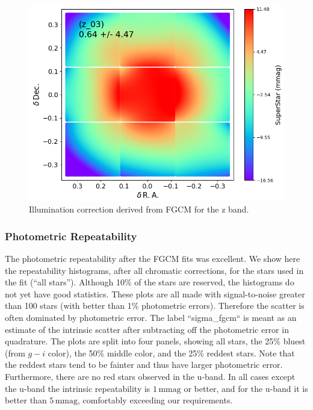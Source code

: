 \begin{figure}
  \includegraphics{photometric_calibration_figures/illumcorr_z.png}
  \caption{Illumination correction derived from FGCM for the z band.}
\end{figure}

\subsubsection{Photometric Repeatability}

The photometric repeatability after the FGCM fits was excellent. We show here
the repeatability histograms, after all chromatic corrections, for the stars
used in the fit (``all stars'').  Although 10\% of the stars are reserved,
the histograms do not yet have good statistics.  These plots are all made with
signal-to-noise greater than 100 stars (with better than 1\% photometric
errors).  Therefore the scatter is often dominated by photometric error.  The
label ``sigma\_fgcm`` is meant as an estimate of the intrinsic scatter after
subtracting off the photometric error in quadrature. The plots are split into
four panels, showing all stars, the 25\% bluest (from $g-i$ color), the 50\%
middle color, and the 25\% reddest stars. Note that the reddest stars tend to
be fainter and thus have larger photometric error. Furthermore, there are no
red stars observed in the u-band. In all cases except the u-band the intrinsic
repeatability is $1\,\mathrm{mmag}$ or better, and for the u-band it is better
than $5\,\mathrm{mmag}$, comfortably exceeding our requirements.

